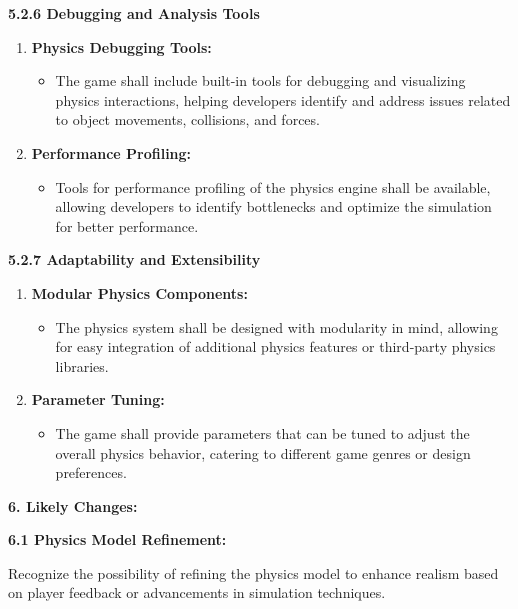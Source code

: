 \documentclass[
]{article}
\begin{document}
\textbf{5.2.6 Debugging and Analysis Tools}

\begin{enumerate}
\def\labelenumi{\arabic{enumi}.}
\item
  \textbf{Physics Debugging Tools:}

  \begin{itemize}
  \item
    The game shall include built-in tools for debugging and visualizing
    physics interactions, helping developers identify and address issues
    related to object movements, collisions, and forces.
  \end{itemize}
\item
  \textbf{Performance Profiling:}

  \begin{itemize}
  \item
    Tools for performance profiling of the physics engine shall be
    available, allowing developers to identify bottlenecks and optimize
    the simulation for better performance.
  \end{itemize}
\end{enumerate}

\textbf{5.2.7 Adaptability and Extensibility}

\begin{enumerate}
\def\labelenumi{\arabic{enumi}.}
\item
  \textbf{Modular Physics Components:}

  \begin{itemize}
  \item
    The physics system shall be designed with modularity in mind,
    allowing for easy integration of additional physics features or
    third-party physics libraries.
  \end{itemize}
\item
  \textbf{Parameter Tuning:}

  \begin{itemize}
  \item
    The game shall provide parameters that can be tuned to adjust the
    overall physics behavior, catering to different game genres or
    design preferences.
  \end{itemize}
\end{enumerate}

\protect\hypertarget{qn}{}{}\textbf{6. Likely Changes:}

\textbf{6.1 Physics Model Refinement:}

Recognize the possibility of refining the physics model to enhance
realism based on player feedback or advancements in simulation
techniques.
\end{document}
